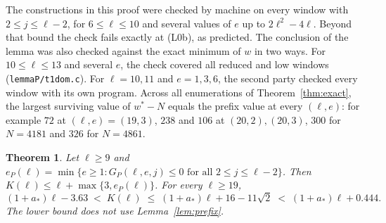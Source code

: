 \documentclass[11pt]{amsart}
\newtheorem{theorem}{Theorem}
\theoremstyle{definition}
\begin{document}
\noindent The constructions in this proof were checked by machine on every window with $2\le j\le\ell-2$, for $6\le\ell\le10$ and several values of $e$ up to $2\ell^2-4\ell$. Beyond that bound the check fails exactly at (L0b), as predicted. The conclusion of the lemma was also checked against the exact minimum of $w$ in two ways. For $10\le\ell\le13$ and several $e$, the check covered all reduced and low windows (\texttt{lemmaP/t1dom.c}). For $\ell=10,11$ and $e=1,3,6$, the second party checked every window with its own program. Across all enumerations of Theorem~\ref{thm:exact}, the largest surviving value of $w^*-N$ equals the prefix value at every $(\ell,e)$: for example $72$ at $(\ell,e)=(19,3)$, $238$ and $106$ at $(20,2),(20,3)$, $300$ for $N=4181$ and $326$ for $N=4861$.

\begin{theorem}\label{thm:prefixK}
Let $\ell\ge9$ and $e_P(\ell)=\min\{e\ge1:G_P(\ell,e,j)\le0\text{ for all }2\le j\le\ell-2\}$. Then $K(\ell)\le\ell+\max\{3,e_P(\ell)\}$. For every $\ell\ge19$,
\[
(1+a_*)\ell-3.63\;<\;K(\ell)\;\le\;(1+a_*)\ell+16-11\sqrt2\;<\;(1+a_*)\ell+0.444 .
\]
The lower bound does not use Lemma~\ref{lem:prefix}.
\end{theorem}
\end{document}
